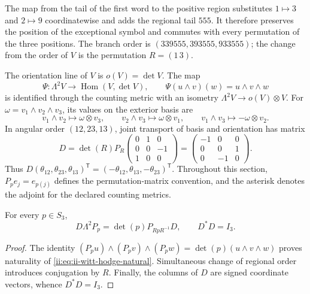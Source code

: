 The map from the tail of the first word to the positive region
substitutes \(1\mapsto3\) and \(2\mapsto9\) coordinatewise and adds
the regional tail \(555\). It therefore preserves the position of the
exceptional symbol and commutes with every permutation of the three positions. The
branch order is \((339555,393555,933555)\); the change from the order of
\(V\) is the permutation \(R=(1\,3)\).

The orientation line of \(V\) is \(o(V)=\det V\). The map
\begin{equation}
 \Psi:\Lambda^2V\longrightarrow\operatorname{Hom}(V,\det V),
 \qquad \Psi(u\wedge v)(w)=u\wedge v\wedge w
 \label{ii:eq:ii-witt-hodge-natural}
\end{equation}
is identified through the counting metric with an isometry
\(\Lambda^2V\to o(V)\otimes V\). For
\(\omega=v_1\wedge v_2\wedge v_3\), its values on the exterior basis
are
\[
 v_1\wedge v_2\mapsto\omega\otimes v_3,
 \qquad v_2\wedge v_3\mapsto\omega\otimes v_1,
 \qquad v_1\wedge v_3\mapsto-\omega\otimes v_2.
\]
In angular order \((12,23,13)\), joint transport of basis and
orientation has matrix
\begin{equation}
 D=\det(R)P_R
 \begin{pmatrix}0&1&0\\0&0&-1\\1&0&0\end{pmatrix}
 =\begin{pmatrix}-1&0&0\\0&0&1\\0&-1&0\end{pmatrix}.
 \label{ii:eq:ii-witt-orientation-D}
\end{equation}
Thus
\(D(\theta_{12},\theta_{23},\theta_{13})^{\mathsf T}
=(-\theta_{12},\theta_{13},-\theta_{23})^{\mathsf T}\).
Throughout this section, \(P_p e_j=e_{p(j)}\) defines the permutation-matrix
convention, and the asterisk denotes the adjoint for the declared
counting metrics.

\begin{proposition}
\label{ii:prop:ii-witt-D-natural}
For every \(p\in S_3\),
\[
 D\Lambda^2P_p=\det(p)P_{RpR^{-1}}D,
 \qquad D^*D=I_3.
\]
\end{proposition}
\begin{proof}
The identity
\((P_pu)\wedge(P_pv)\wedge(P_pw)=\det(p)(u\wedge v\wedge w)\)
proves naturality of \eqref{ii:eq:ii-witt-hodge-natural}. Simultaneous
change of regional order introduces conjugation by \(R\).
Finally, the columns of \(D\) are signed coordinate vectors,
whence \(D^*D=I_3\).
\end{proof}

